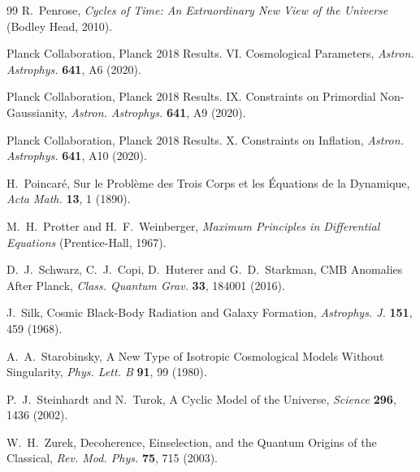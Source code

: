 \documentclass[11pt]{article}
\theoremstyle{definition}
\theoremstyle{remark}
\begin{document}
\begin{thebibliography}{99}
 R.~Penrose, \emph{Cycles of Time: An Extraordinary New View of the Universe} (Bodley Head, 2010).

 Planck Collaboration, Planck 2018 Results. VI. Cosmological Parameters, \emph{Astron. Astrophys.} \textbf{641}, A6 (2020).

 Planck Collaboration, Planck 2018 Results. IX. Constraints on Primordial Non-Gaussianity, \emph{Astron. Astrophys.} \textbf{641}, A9 (2020).

 Planck Collaboration, Planck 2018 Results. X. Constraints on Inflation, \emph{Astron. Astrophys.} \textbf{641}, A10 (2020).

 H.~Poincar\'e, Sur le Probl\`eme des Trois Corps et les \'Equations de la Dynamique, \emph{Acta Math.} \textbf{13}, 1 (1890).

 M.~H.~Protter and H.~F.~Weinberger, \emph{Maximum Principles in Differential Equations} (Prentice-Hall, 1967).

 D.~J.~Schwarz, C.~J.~Copi, D.~Huterer and G.~D.~Starkman, CMB Anomalies After Planck, \emph{Class. Quantum Grav.} \textbf{33}, 184001 (2016).

 J.~Silk, Cosmic Black-Body Radiation and Galaxy Formation, \emph{Astrophys. J.} \textbf{151}, 459 (1968).

 A.~A.~Starobinsky, A New Type of Isotropic Cosmological Models Without Singularity, \emph{Phys. Lett. B} \textbf{91}, 99 (1980).

 P.~J.~Steinhardt and N.~Turok, A Cyclic Model of the Universe, \emph{Science} \textbf{296}, 1436 (2002).

 W.~H.~Zurek, Decoherence, Einselection, and the Quantum Origins of the Classical, \emph{Rev. Mod. Phys.} \textbf{75}, 715 (2003).

\end{thebibliography}
\end{document}
